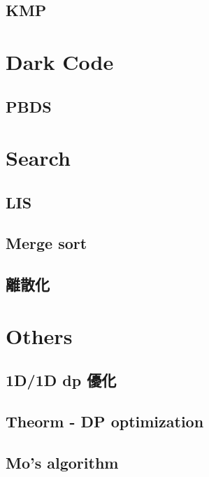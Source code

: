\subsection{KMP}



\section{Dark Code}

\subsection{PBDS}


\section{Search}

\subsection{LIS}

\subsection{Merge sort}

\subsection{離散化}



\section{Others}

\subsection{1D/1D dp 優化}

\subsection{Theorm - DP optimization}

\subsection{Mo's algorithm}


